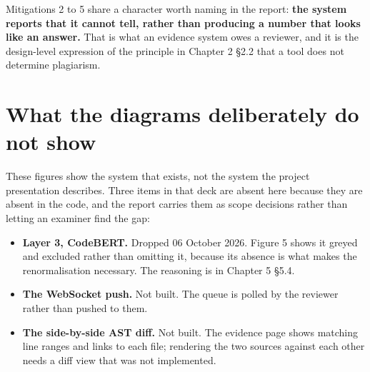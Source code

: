 Mitigations 2 to 5 share a character worth naming in the report:
\textbf{the system reports that it cannot tell, rather than producing a
number that looks like an answer.} That is what an evidence system owes
a reviewer, and it is the design-level expression of the principle in
Chapter 2 \S{}2.2 that a tool does not determine plagiarism.

\hypertarget{what-the-diagrams-deliberately-do-not-show}{%
\section{What the diagrams deliberately do not
show}\label{what-the-diagrams-deliberately-do-not-show}}

These figures show the system that exists, not the system the project
presentation describes. Three items in that deck are absent here because
they are absent in the code, and the report carries them as scope
decisions rather than letting an examiner find the gap:

\begin{itemize}
\tightlist
\item
  \textbf{Layer 3, CodeBERT.} Dropped 06 October 2026. Figure 5 shows it
  greyed and excluded rather than omitting it, because its absence is
  what makes the renormalisation necessary. The reasoning is in Chapter
  5 \S{}5.4.
\item
  \textbf{The WebSocket push.} Not built. The queue is polled by the
  reviewer rather than pushed to them.
\item
  \textbf{The side-by-side AST diff.} Not built. The evidence page shows
  matching line ranges and links to each file; rendering the two sources
  against each other needs a diff view that was not implemented.
\end{itemize}
